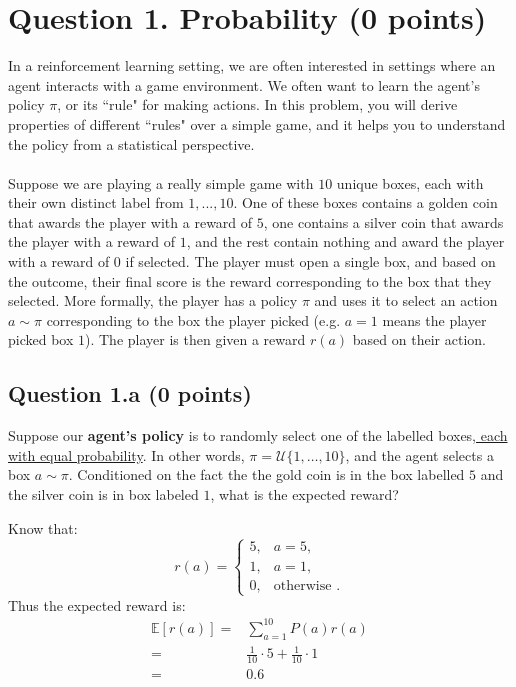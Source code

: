 \documentclass[12pt]{article}
\begin{document}

\section*{Question 1. Probability (0 points)}
In a reinforcement learning setting, we are often interested in settings where an agent interacts with a game environment. We often want to learn the agent's policy $\pi$, or its ``rule" for making actions. In this problem, you will derive properties of different ``rules" over a simple game, and it helps you to understand the policy from a statistical perspective.
\\\\
Suppose we are playing a really simple game with $10$ unique boxes, each with their own distinct label from $1,...,10$. One of these boxes contains a golden coin that awards the player with a reward of $5$, one contains a silver coin that awards the player with a reward of $1$, and the rest contain nothing and award the player with a reward of $0$ if selected. The player must open a single box, and based on the outcome, their final score is the reward corresponding to the box that they selected. More formally, the player has a policy $\pi$ and uses it to select an action $a \sim \pi$ corresponding to the box the player picked (e.g. $a=1$ means the player picked box $1$). The player is then given a reward $r(a)$ based on their action.

\subsection*{Question 1.a (0 points)}

Suppose our \textbf{agent's policy} is to randomly select one of the labelled boxes,\href{https://en.wikipedia.org/wiki/Discrete_uniform_distribution}{ each with equal probability}. In other words, $\pi = \mathcal{U}\{1,\dots, 10\}$, and the agent selects a box $a \sim \pi$. Conditioned on the fact the the gold coin is in the box labelled $5$ and the silver coin is in box labeled $1$, what is the expected reward?

\begin{solution}
Know that:
\begin{equation}
    r(a) = \begin{cases}
5, & a = 5, \\
1, & a = 1, \\
0, & \text{otherwise }.
\end{cases}
\end{equation}
Thus the expected reward is: 
\begin{align}
    \mathbb{E}[r(a)] = & \sum_{a=1}^{10}P(a)r(a) \\
    = & \frac{1}{10}\cdot 5 +\frac{1}{10}\cdot 1 \\
    = & 0.6
\end{align} 
\end{solution}
\end{document}
